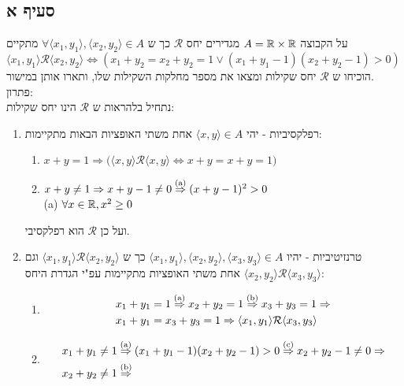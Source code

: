 \documentclass{article}
\begin{document}
	\subsection*{סעיף א}
	על הקבוצה $A = \mathbb{R} \times \mathbb{R}$ מגדירים יחס $\mathcal{R}$ כך ש
	$\forall \langle x_1, y_1 \rangle, \langle x_2, y_2 \rangle \in A$ מתקיים
	$\langle x_1, y_1 \rangle \mathcal{R} \langle x_2, y_2 \rangle \iff (x_1 + y_2 = x_2 + y_2 = 1 \lor (x_1 + y_1 - 1)(x_2 + y_2  - 1) > 0)$ \\
	הוכיחו ש $\mathcal{R}$ יחס שקילות ומצאו את מספר מחלקות השקילות שלו, ותארו אותן במישור. \\
	פתרון: \\
	נתחיל בלהראות ש $\mathcal{R}$ הינו יחס שקילות:
	\begin{enumerate}
		\item רפלקסיביות -
		יהי $\langle x, y \rangle \in A$ אחת משתי האופציות הבאות מתקיימות:
		\begin{enumerate}
			\item  $x + y = 1 \Rightarrow \Big( \langle x, y \rangle \mathcal{R} \langle x, y \rangle \iff x + y = x + y = 1 \Big)$
			\item $x + y \neq 1 \Rightarrow x + y - 1 \neq 0 \overset{\text{(a)}}\Rightarrow (x+y-1)^2 > 0$ \\
			(a) $\forall x \in \mathbb{R},  x^2 \geq 0$
		\end{enumerate}
		ועל כן $\mathcal{R}$ הוא רפלקסיבי.
		\item  טרנזיטיביות -
		יהיו $\langle x_1, y_1 \rangle, \langle x_2, y_2 \rangle, \langle x_3, y_3 \rangle \in A$
		כך ש $\langle x_1, y_1 \rangle \mathcal{R} \langle x_2, y_2 \rangle$ וגם $\langle x_2, y_2 \rangle \mathcal{R} \langle x_3, y_3 \rangle$
		אחת משתי האופציות מתקיימות עפ"י הגדרת היחס:
		\begin{enumerate}
			\item \begin{align*}
			&x_1 + y_1 = 1 \overset{\text{(a)}}\Rightarrow
			x_2 + y_2 = 1 \overset{\text{(b)}}\Rightarrow
			x_3 + y_3 = 1 \Rightarrow \\
			&x_1+y_1 = x_3 + y_3 = 1 \Rightarrow
			\langle x_1, y_1 \rangle \mathcal{R} \langle x_3, y_3 \rangle
			\end{align*}
			\item \begin{align*}
				&x_1 + y_1 \neq 1 \ontop{(a)}\Rightarrow
				(x_1 + y_1 - 1)(x_2 + y_2 - 1) > 0 \ontop{(c)}\Rightarrow
				x_2 + y_2 - 1 \neq 0 \Rightarrow \\
				&x_2 + y_2 \neq 1 \ontop{(b)}\Rightarrow

\end{align*}
\end{enumerate}
\end{enumerate}
\end{document}
